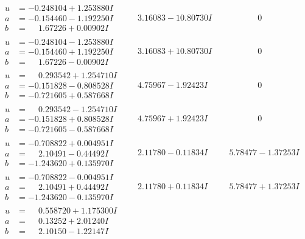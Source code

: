\documentclass[1p]{elsarticle_modified}
\theoremstyle{definition}
\begin{document}
$$\begin{array}{c|c|c}
\begin{aligned}
u &= -0.248104 + 1.253880 I \\
a &= -0.154460 - 1.192250 I \\
b &= \phantom{-}1.67226 + 0.00902 I\end{aligned}
 & \phantom{-}3.16083 - 10.80730 I & \phantom{-0.000000 } 0 \\ \hline\begin{aligned}
u &= -0.248104 - 1.253880 I \\
a &= -0.154460 + 1.192250 I \\
b &= \phantom{-}1.67226 - 0.00902 I\end{aligned}
 & \phantom{-}3.16083 + 10.80730 I & \phantom{-0.000000 } 0 \\ \hline\begin{aligned}
u &= \phantom{-}0.293542 + 1.254710 I \\
a &= -0.151828 - 0.808528 I \\
b &= -0.721605 + 0.587668 I\end{aligned}
 & \phantom{-}4.75967 - 1.92423 I & \phantom{-0.000000 } 0 \\ \hline\begin{aligned}
u &= \phantom{-}0.293542 - 1.254710 I \\
a &= -0.151828 + 0.808528 I \\
b &= -0.721605 - 0.587668 I\end{aligned}
 & \phantom{-}4.75967 + 1.92423 I & \phantom{-0.000000 } 0 \\ \hline\begin{aligned}
u &= -0.708822 + 0.004951 I \\
a &= \phantom{-}2.10491 - 0.44492 I \\
b &= -1.243620 + 0.135970 I\end{aligned}
 & \phantom{-}2.11780 - 0.11834 I & \phantom{-}5.78477 - 1.37253 I \\ \hline\begin{aligned}
u &= -0.708822 - 0.004951 I \\
a &= \phantom{-}2.10491 + 0.44492 I \\
b &= -1.243620 - 0.135970 I\end{aligned}
 & \phantom{-}2.11780 + 0.11834 I & \phantom{-}5.78477 + 1.37253 I \\ \hline\begin{aligned}
u &= \phantom{-}0.558720 + 1.175300 I \\
a &= \phantom{-}0.13252 + 2.01240 I \\
b &= \phantom{-}2.10150 - 1.22147 I\end{aligned}

\end{array}$$
\end{document}
